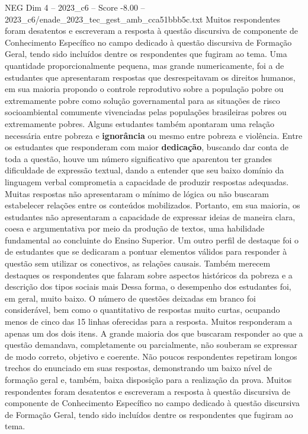 \begin{textsample}{NEG Dim 4 – 2023\_c6 – Score -8.00 – 2023\_c6/enade\_2023\_tec\_gest\_amb\_cca51bbb5c.txt}
Muitos respondentes foram desatentos e escreveram a resposta à questão discursiva de componente de Conhecimento Específico no campo dedicado à questão discursiva de Formação Geral, tendo sido incluídos dentre os respondentes que fugiram ao tema.
Uma quantidade proporcionalmente pequena, mas grande numericamente, foi a de estudantes que apresentaram respostas que desrespeitavam os direitos humanos, em sua maioria propondo o controle reprodutivo sobre a população pobre ou extremamente pobre como solução governamental para as situações de risco socioambiental comumente vivenciadas pelas populações brasileiras pobres ou extremamente pobres.
Alguns estudantes também apontaram uma relação necessária entre pobreza e \textbf{ignorância} ou mesmo entre pobreza e violência.
Entre os estudantes que responderam com maior \textbf{dedicação}, buscando dar conta de toda a questão, houve um número significativo que aparentou ter grandes dificuldade de expressão textual, dando a entender que seu baixo domínio da linguagem verbal comprometia a capacidade de produzir respostas adequadas.
Muitas respostas não apresentaram o mínimo de lógica ou não buscaram estabelecer relações entre os conteúdos mobilizados.
Portanto, em sua maioria, os estudantes não apresentaram a capacidade de expressar ideias de maneira clara, coesa e argumentativa por meio da produção de textos, uma habilidade fundamental ao concluinte do Ensino Superior.
Um outro perfil de destaque foi o de estudantes que se dedicaram a pontuar elementos válidos para responder à questão sem utilizar os conectivos, as relações causais.
Também merecem destaques os respondentes que falaram sobre aspectos históricos da pobreza e a descrição dos tipos sociais mais Dessa forma, o desempenho dos estudantes foi, em geral, muito baixo.
O número de questões deixadas em branco foi considerável, bem como o quantitativo de respostas muito curtas, ocupando menos de cinco das 15 linhas oferecidas para a resposta.
Muitos responderam a apenas um dos dois itens.
A grande maioria dos que buscaram responder ao que a questão demandava, completamente ou parcialmente, não souberam se expressar de modo correto, objetivo e coerente.
Não poucos respondentes repetiram longos trechos do enunciado em suas respostas, demonstrando um baixo nível de formação geral e, também, baixa disposição para a realização da prova.
Muitos respondentes foram desatentos e escreveram a resposta à questão discursiva de componente de Conhecimento Específico no campo dedicado à questão discursiva de Formação Geral, tendo sido incluídos dentre os respondentes que fugiram ao tema.

\end{textsample}
